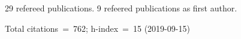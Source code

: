 29 refereed publications. 9 refeered publications as first author.

Total citations~=~762; h-index~=~15 (2019-09-15)